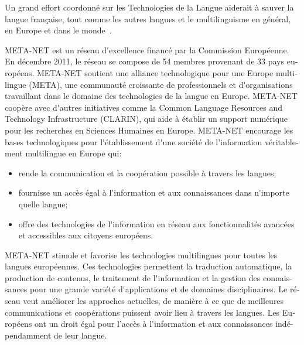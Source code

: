 \begin{french}
\begin{multicols}{2}
Un grand effort coordonné sur les Technologies de la Langue aiderait à
sauver la langue française, tout comme les autres langues et le
multilinguisme en général, en Europe et dans le monde~\cite{worldconclusion}.

\end{multicols}

\clearpage


\begin{multicols}{2}
META-NET est un réseau d{\mbox '}excellence financé par la Commission Européenne. En décembre 2011, le réseau se compose de 54 membres provenant de 33 pays européens. META-NET soutient une alliance technologique pour une Europe multilingue (META), une communauté croissante de professionnels et d{\mbox '}organisations travaillant dans le domaine des technologies de la langue en Europe. META-NET coopère avec d{\mbox '}autres initiatives comme la Common Language Resources and Technology Infrastructure  (CLARIN), qui aide à établir un support numérique pour les recherches en Sciences Humaines en Europe. META-NET encourage les bases technologiques pour l{\mbox '}établissement d{\mbox '}une société de l{\mbox '}information véritablement multilingue en Europe qui:

\begin{itemize}
\item rende la communication et la coopération possible à travers les langues; 
\item fournisse un accès égal à l{\mbox '}information et aux connaissances dans n{\mbox '}importe quelle langue; 
\item offre des technologies de l{\mbox '}information en réseau aux fonctionnalités avancées et accessibles aux citoyens européens.
\end{itemize}


META-NET stimule et favorise les technologies multilingues pour toutes les langues européennes. Ces technologies permettent la traduction automatique, la production de contenus, le traitement de l{\mbox '}information et la gestion des connaissances pour une grande variété d{\mbox '}applications et de domaines disciplinaires. Le réseau veut améliorer les approches actuelles, de manière à ce que de meilleures communications et coopérations puissent avoir lieu à travers les langues. Les Européens ont un droit égal pour l'accès à l{\mbox '}information et aux connaissances indépendamment de leur langue. 


\end{multicols}
\end{french}
